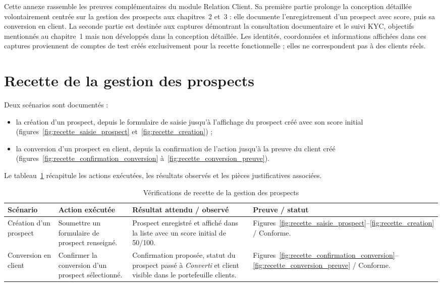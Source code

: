 Cette annexe rassemble les preuves complémentaires du module Relation Client.
Sa première partie prolonge la conception détaillée volontairement centrée sur
la gestion des prospects aux chapitres~2 et~3 : elle documente l'enregistrement
d'un prospect avec score, puis sa conversion en client. La seconde partie est
destinée aux captures démontrant la consultation documentaire et le suivi KYC,
objectifs mentionnés au chapitre~1 mais non développés dans la conception
détaillée.
Les identités, coordonnées et informations affichées dans ces captures
proviennent de comptes de test créés exclusivement pour la recette
fonctionnelle ; elles ne correspondent pas à des clients réels.

\section{Recette de la gestion des prospects}

Deux scénarios sont documentés :
\begin{itemize}
  \item la création d'un prospect, depuis le formulaire de saisie jusqu'à
        l'affichage du prospect créé avec son score initial
        (figures~\ref{fig:recette_saisie_prospect} et~\ref{fig:recette_creation}) ;
  \item la conversion d'un prospect en client, depuis la confirmation de
        l'action jusqu'à la preuve du client créé
        (figures~\ref{fig:recette_confirmation_conversion}
        à~\ref{fig:recette_conversion_preuve}).
\end{itemize}

Le tableau~\ref{tab:pieces_recette_annexe} récapitule les actions exécutées,
les résultats observés et les pièces justificatives associées.

\begin{table}[H]
\centering
\caption{Vérifications de recette de la gestion des prospects}
\label{tab:pieces_recette_annexe}
\footnotesize
\renewcommand{\arraystretch}{1.18}
\begin{tabularx}{\textwidth}{|p{2.65cm}|p{3.25cm}|X|p{2.55cm}|}
\hline
\textbf{Scénario} & \textbf{Action exécutée} &
\textbf{Résultat attendu / observé} & \textbf{Preuve / statut} \\ \hline
Création d'un prospect &
Soumettre un formulaire de prospect renseigné. &
Prospect enregistré et affiché dans la liste avec un score initial de 50/100. &
Figures~\ref{fig:recette_saisie_prospect}--\ref{fig:recette_creation} /
Conforme. \\ \hline
Conversion en client &
Confirmer la conversion d'un prospect sélectionné. &
Confirmation proposée, statut du prospect passé à \textit{Converti} et client
visible dans le portefeuille clients. &
Figures~\ref{fig:recette_confirmation_conversion}--\ref{fig:recette_conversion_preuve} /
Conforme. \\ \hline
\end{tabularx}
\end{table}

